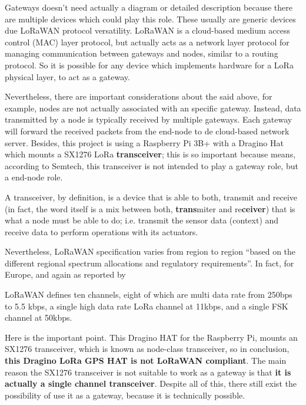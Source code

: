 \documentclass[11pt,a4paper,dvipsnames,twoside]{article}
\newcounter{subsubsubsection}[subsubsection]
\newcommand{\doubt}[1] {\textbf{\color{Red3}#1}}
\begin{document}
Gateways doesn't need actually a diagram or detailed description because there are multiple devices which could play this role. These usually are generic devices due LoRaWAN protocol versatility. LoRaWAN is a cloud-based medium access control (MAC) layer protocol, but actually acts as a network layer protocol for managing communication between gateways and nodes, similar to a routing protocol. So it is possible for any device which implements hardware for a LoRa physical layer, to act as a gateway.

Nevertheless, there are important considerations about the said above, for example, nodes are not actually associated with an specific gateway. Instead, data transmitted by a node is typically received by multiple gateways. Each gateway will forward the received packets from the end-node to de cloud-based network server. Besides, this project is using a Raspberry Pi 3B+ with a Dragino Hat which mounts a SX1276 LoRa \textbf{transceiver}\cite{SX1276}; this is so important because means, according to Semtech, this transceiver is not intended to play a gateway role, but a end-node role.

A transceiver, by definition, is a device that is able to both, transmit and receive (in fact, the word itself is a mix between both, \textbf{trans}miter and re\textbf{ceiver}) that is what a node must be able to do; i.e. transmit the sensor data (context) and receive data to perform operations with its actuators. 

Nevertheless, LoRaWAN specification varies from region to region \enquote{based on
the different regional spectrum allocations and regulatory requirements}\cite[p.~12]{LoRaWANspec}. In fact, for Europe, and again as reported by \cite[p.~13]{LoRaWANspec} 

\begin{quoting}
LoRaWAN defines ten channels, eight of which are multi data rate from 250bps to
5.5 kbps, a single high data rate LoRa channel at 11kbps, and a single FSK channel
at 50kbps.
\end{quoting}

Here is the important point. This Dragino HAT for the Raspberry Pi, mounts an SX1276 transceiver, which is known as node-class transceiver, so in conclusion, \textbf{this Dragino LoRa GPS HAT is not LoRaWAN compliant}. The main reason the SX1276 transceiver is not suitable to work as a gateway is that \doubt{it is actually a single channel transceiver}. Despite all of this, there still exist the possibility of use it as a gateway, because it is technically possible. 
\end{document}

